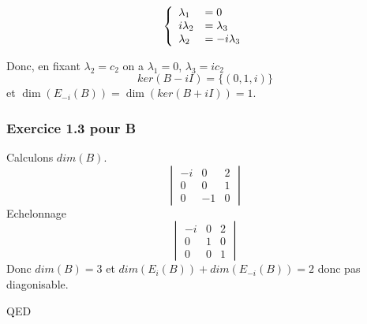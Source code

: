 \documentclass[]{book}
\theoremstyle{definition}
\begin{document}
$$
\left\{ 
\begin{array}{l l}
\lambda_{1}  & = 0\\
i\lambda_{2}  & = \lambda_{3}\\
\lambda_{2}  & = - i\lambda_{3}\\
\end{array}
\right. 
$$ 

Donc, en fixant $\lambda_2 = c_2$ on a $\lambda_1 = 0$, $\lambda_3 = ic_2$
$$ker(B-iI) = \{(0,1,i)\}$$ 
et $\dim(E_{-i}(B))= \dim(ker(B+iI)) = 1$.


\subsubsection*{Exercice 1.3 pour B}
Calculons $dim(B)$.
$$\begin{vmatrix} -i & 0 & 2 \\ 0 & 0 & 1 \\ 0 & -1 & 0 \end{vmatrix}$$
Echelonnage
$$\begin{vmatrix} -i & 0 & 2  \\ 0 & 1 & 0 \\ 0 & 0 & 1 \end{vmatrix}$$
Donc $dim(B)=3$ et $dim(E_{i}(B))+dim(E_{-i}(B)) = 2$ donc pas diagonisable. 

QED
\end{document}
